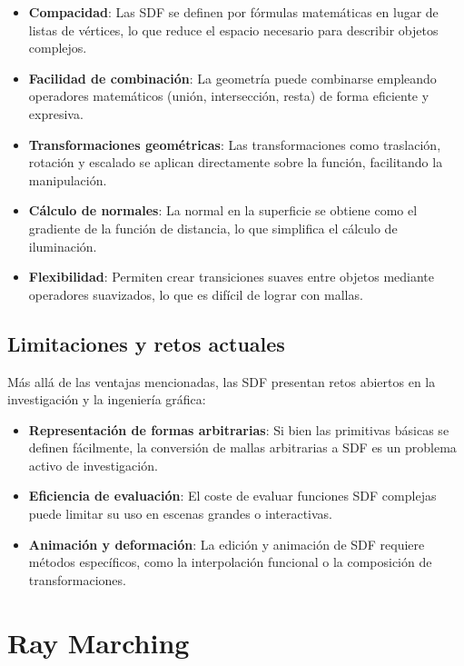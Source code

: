 \begin{itemize}
    \item \textbf{Compacidad}: Las SDF se definen por fórmulas matemáticas en lugar de listas de vértices, lo que reduce el espacio necesario para describir objetos complejos.
    \item \textbf{Facilidad de combinación}: La geometría puede combinarse empleando operadores matemáticos (unión, intersección, resta) de forma eficiente y expresiva.
    \item \textbf{Transformaciones geométricas}: Las transformaciones como traslación, rotación y escalado se aplican directamente sobre la función, facilitando la manipulación.
    \item \textbf{Cálculo de normales}: La normal en la superficie se obtiene como el gradiente de la función de distancia, lo que simplifica el cálculo de iluminación.
    \item \textbf{Flexibilidad}: Permiten crear transiciones suaves entre objetos mediante operadores suavizados, lo que es difícil de lograr con mallas.
\end{itemize}

\subsection{Limitaciones y retos actuales}

Más allá de las ventajas mencionadas, las SDF presentan retos abiertos en la
investigación y la ingeniería gráfica:

\begin{itemize}
    \item \textbf{Representación de formas arbitrarias}: Si bien las primitivas básicas se definen fácilmente, la conversión de mallas arbitrarias a SDF es un problema activo de investigación.
    \item \textbf{Eficiencia de evaluación}: El coste de evaluar funciones SDF complejas puede limitar su uso en escenas grandes o interactivas.
    \item \textbf{Animación y deformación}: La edición y animación de SDF requiere métodos específicos, como la interpolación funcional o la composición de transformaciones.
\end{itemize}

\section{Ray Marching}

